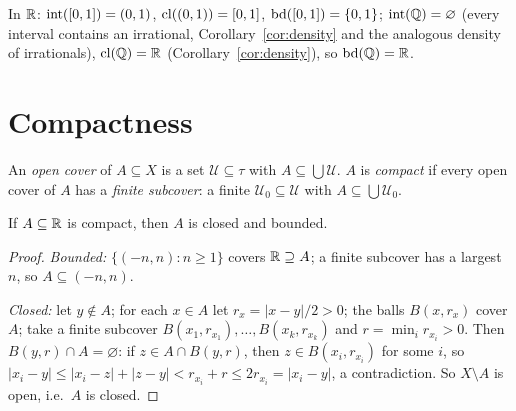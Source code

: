 \begin{example}
	In $\mathbb{R}$: $\operatorname{int}([0,1])=(0,1)$, $\operatorname{cl}((0,1))=[0,1]$, $\operatorname{bd}([0,1])=\{0,1\}$; $\operatorname{int}(\mathbb{Q})=\varnothing$ (every interval contains an irrational, Corollary~\ref{cor:density} and the analogous density of irrationals), $\operatorname{cl}(\mathbb{Q})=\mathbb{R}$ (Corollary~\ref{cor:density}), so $\operatorname{bd}(\mathbb{Q})=\mathbb{R}$.
\end{example}

\section{Compactness}

\begin{definition}
	An \emph{open cover} of $A\subseteq X$ is a set $\mathcal U\subseteq\tau$ with $A\subseteq\bigcup\mathcal U$. $A$ is \emph{compact} if every open cover of $A$ has a \emph{finite subcover}: a finite $\mathcal U_0\subseteq\mathcal U$ with $A\subseteq\bigcup\mathcal U_0$.
\end{definition}

\begin{theorem}\label{thm:hb-closed-bounded}
	If $A\subseteq\mathbb{R}$ is compact, then $A$ is closed and bounded.
\end{theorem}
\begin{proof}
	\emph{Bounded:} $\{(-n,n):n\ge1\}$ covers $\mathbb{R}\supseteq A$; a finite subcover has a largest $n$, so $A\subseteq(-n,n)$.
	
	\emph{Closed:} let $y\notin A$; for each $x\in A$ let $r_x=|x-y|/2>0$; the balls $B(x,r_x)$ cover $A$; take a finite subcover $B(x_1,r_{x_1}),\dots,B(x_k,r_{x_k})$ and $r=\min_ir_{x_i}>0$. Then $B(y,r)\cap A=\varnothing$: if $z\in A\cap B(y,r)$, then $z\in B(x_i,r_{x_i})$ for some $i$, so $|x_i-y|\le|x_i-z|+|z-y|<r_{x_i}+r\le2r_{x_i}=|x_i-y|$, a contradiction. So $X\setminus A$ is open, i.e.\ $A$ is closed.
\end{proof}

